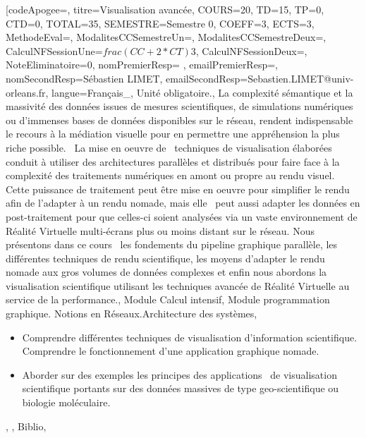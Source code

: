 \module[codeApogee={},
titre={Visualisation avancée},
COURS={20},
TD={15},
TP={0},
CTD={0},
TOTAL={35},
SEMESTRE={Semestre 0},
COEFF={3},
ECTS={3},
MethodeEval={},
ModalitesCCSemestreUn={},
ModalitesCCSemestreDeux={},
CalculNFSessionUne={$frac{(CC+2*CT)}{3}$},
CalculNFSessionDeux={},
NoteEliminatoire={0},
nomPremierResp={ },
emailPremierResp={},
nomSecondResp={Sébastien LIMET},
emailSecondResp={Sebastien.LIMET@univ-orleans.fr},
langue={Français_},
{Unité obligatoire.},
{La complexité sémantique et la massivité des données issues de mesures scientifiques, de simulations numériques ou d'immenses bases de données disponibles sur le réseau, rendent indispensable le recours à la médiation visuelle pour en permettre une appréhension la plus riche possible.  La mise en oeuvre de  techniques de visualisation élaborées conduit à utiliser des architectures parallèles et distribués pour faire face à la complexité des traitements numériques en amont ou propre au rendu visuel. Cette puissance de traitement peut être mise en oeuvre pour simplifier le rendu afin de l'adapter à un rendu nomade, mais elle  peut aussi adapter les données en post-traitement pour que celles-ci soient analysées via un vaste environnement de Réalité Virtuelle multi-écrans plus ou moins distant sur le réseau.
Nous présentons dans ce cours  les fondements du pipeline graphique parallèle, les différentes techniques de rendu scientifique, les moyens d'adapter le rendu nomade aux gros volumes de données complexes et enfin nous abordons la visualisation scientifique utilisant les techniques avancée de Réalité Virtuelle au service de la performance.},
{Module Calcul intensif, Module programmation graphique. Notions en Réseaux.Architecture des systèmes},
{\begin{itemize}
\item Comprendre différentes techniques de visualisation d'information scientifique. Comprendre le fonctionnement d'une application graphique nomade.
\item Aborder sur des exemples les principes des applications  de visualisation scientifique portants sur des données massives de type geo-scientifique ou biologie moléculaire.
\end{itemize}},
{},
{Biblio},

\vfill


